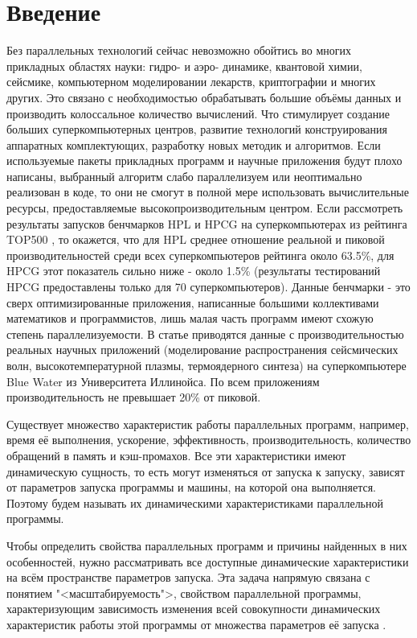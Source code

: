 \section{Введение}
	Без параллельных технологий сейчас невозможно обойтись во многих прикладных областях науки: гидро- и аэро- динамике, квантовой химии, сейсмике, компьютерном моделировании лекарств, криптографии и многих других. Это связано с необходимостью обрабатывать большие объёмы данных и производить колоссальное количество вычислений. Что стимулирует создание больших суперкомпьютерных центров, развитие технологий конструирования аппаратных комплектующих, разработку новых методик и алгоритмов.
	Если используемые пакеты прикладных программ и научные приложения будут плохо написаны, выбранный алгоритм слабо параллелизуем или неоптимально реализован в коде, то они не смогут в полной мере использовать вычислительные ресурсы, предоставляемые высокопроизводительным центром. Если рассмотреть результаты запусков бенчмарков HPL и HPCG на суперкомпьютерах из рейтинга TOP500 \cite{top500}, то окажется, что для HPL среднее отношение реальной и пиковой производительностей среди всех суперкомпьютеров рейтинга около 63.5\%, для HPCG этот показатель сильно ниже - около 1.5\% (результаты тестирований HPCG предоставлены только для 70 суперкомпьютеров). Данные бенчмарки - это сверх оптимизированные приложения, написанные большими коллективами математиков и программистов, лишь малая часть программ имеют схожую степень параллелизуемости. В статье \cite{Perf_low} приводятся данные с производительностью реальных научных приложений (моделирование распространения сейсмических волн, высокотемпературной плазмы, термоядерного синтеза) на суперкомпьютере Blue Water из Университета Иллинойса. По всем приложениям производительность не превышает 20\% от пиковой.

	Существует множество характеристик работы параллельных программ, например, время её выполнения, ускорение, эффективность, производительность, количество обращений в память и кэш-промахов. Все эти характеристики имеют динамическую сущность, то есть могут изменяться от запуска к запуску, зависят от параметров запуска программы и машины, на которой она выполняется. Поэтому будем называть их динамическими характеристиками параллельной программы.

	Чтобы определить свойства параллельных программ и причины найденных в них особенностей, нужно рассматривать все доступные динамические характеристики на всём пространстве параметров запуска. Эта задача напрямую связана с понятием "<масштабируемость">, свойством параллельной программы, характеризующим зависимость изменения всей совокупности динамических характеристик работы этой программы от множества параметров её запуска \cite{scalability_def}.

